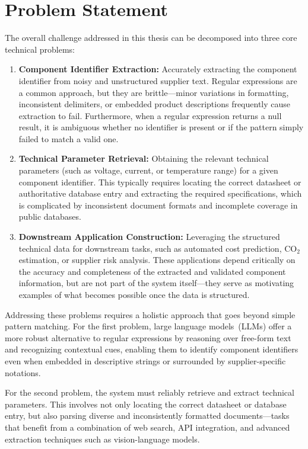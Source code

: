 \section{Problem Statement }
The overall challenge addressed in this thesis can be decomposed into three core technical problems:

\begin{enumerate}
    \item \textbf{Component Identifier Extraction:} Accurately extracting the component identifier from noisy and unstructured supplier text. Regular expressions are a common approach, but they are brittle—minor variations in formatting, inconsistent delimiters, or embedded product descriptions frequently cause extraction to fail. Furthermore, when a regular expression returns a null result, it is ambiguous whether no identifier is present or if the pattern simply failed to match a valid one.
    \item \textbf{Technical Parameter Retrieval:} Obtaining the relevant technical parameters (such as voltage, current, or temperature range) for a given component identifier. This typically requires locating the correct datasheet or authoritative database entry and extracting the required specifications, which is complicated by inconsistent document formats and incomplete coverage in public databases.
    \item \textbf{Downstream Application Construction:} Leveraging the structured technical data for downstream tasks, such as automated cost prediction, CO$_2$ estimation, or supplier risk analysis. These applications depend critically on the accuracy and completeness of the extracted and validated component information, but are not part of the system itself—they serve as motivating examples of what becomes possible once the data is structured.
\end{enumerate}

Addressing these problems requires a holistic approach that goes beyond simple pattern matching. For the first problem, large language models~(LLMs) offer a more robust alternative to regular expressions by reasoning over free-form text and recognizing contextual cues, enabling them to identify component identifiers even when embedded in descriptive strings or surrounded by supplier-specific notations.

For the second problem, the system must reliably retrieve and extract technical parameters. This involves not only locating the correct datasheet or database entry, but also parsing diverse and inconsistently formatted documents—tasks that benefit from a combination of web search, API integration, and advanced extraction techniques such as vision-language models.

